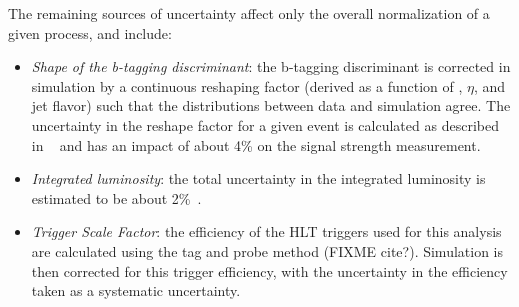 The remaining sources of uncertainty affect only the overall normalization of a given process, and include:
\begin{itemize}
    \item \emph{Shape of the b-tagging discriminant}: the b-tagging discriminant is corrected in simulation by a continuous reshaping factor (derived as a function of \pT, $\eta$, and jet flavor) such that the distributions between data and simulation agree. The uncertainty in the reshape factor for a given event is calculated as described in ~\cite{Sirunyan_2018_deepcsv} and has an impact of about 4\% on the \ttH signal strength measurement.
    \item \emph{Integrated luminosity}: the total uncertainty in the integrated luminosity is estimated to be about 2\%~\cite{CMS-PAS-LUM-17-001,CMS-PAS-LUM-17-004,CMS-PAS-LUM-18-002}.
    \item \emph{Trigger Scale Factor}: the efficiency of the HLT triggers used for this analysis are calculated using the tag and probe method (FIXME cite?). Simulation is then corrected for this trigger efficiency, with the uncertainty in the efficiency taken as a systematic uncertainty.
\end{itemize}


